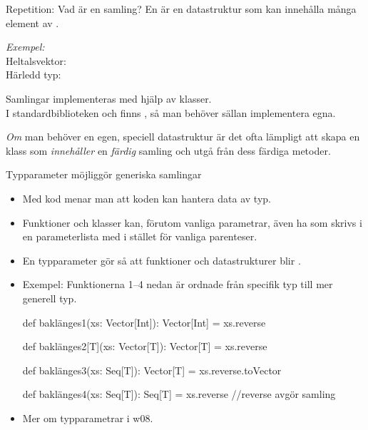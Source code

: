 


\begin{Slide}{Repetition: Vad är en samling?}
En   är en datastruktur som kan innehålla många element av .

\pause
\vspace{2em}\emph{Exempel:} \\Heltalsvektor: \hfill{}\\
\pause
Härledd typ: \hfill{}


\pause
{\SlideFontSmall\vspace{2em}Samlingar implementeras med hjälp av klasser. \\ I standardbiblioteken  och  finns  , så man behöver sällan implementera egna.

\pause\vspace{0.5em}\emph{Om} man behöver en egen, speciell datastruktur är det ofta lämpligt att skapa en klass som \emph{innehåller} en \emph{färdig} samling och utgå från dess färdiga metoder.

}
\end{Slide}



\begin{Slide}{Typparameter möjliggör generiska samlingar}\SlideFontSmall

\begin{itemize}
  \item Med   kod menar man att koden kan hantera data av  typ.
  \item Funktioner och klasser kan, förutom vanliga parametrar, även ha  som skrivs i en  parameterlista med  i stället för vanliga parenteser.

  \item En typparameter gör så att funktioner och datastrukturer blir .

  \item Exempel: Funktionerna  1--4 nedan är ordnade från specifik typ till mer generell typ.

\begin{Code}
def baklänges1(xs: Vector[Int]): Vector[Int] = xs.reverse

def baklänges2[T](xs: Vector[T]): Vector[T] = xs.reverse

def baklänges3(xs: Seq[T]): Vector[T] = xs.reverse.toVector

def baklänges4(xs: Seq[T]): Seq[T] = xs.reverse  //reverse avgör samling
\end{Code}
\item Mer om typparametrar i w08.
\end{itemize}
\end{Slide}



